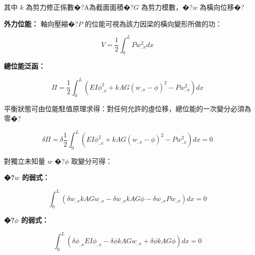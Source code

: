 \documentclass[UTF8, a4paper, 12pt]{ctexart}
\begin{document}
其中 $k$ 為剪力修正係數�?A$ 為截面面積�?G$ 為剪力模數，�?$w$ 為橫向位移�?



\textbf{外力位能：} 軸向壓縮�?$P$ 的位能可視為該力因梁的橫向變形所做的功：

\begin{equation}

    V = \frac{1}{2}\int_{0}^{L}Pw_{,x}^{2}dx

\end{equation}



\textbf{總位能泛函：}

\begin{equation}

    \Pi = \frac{1}{2}\int_{0}^{L}(EI\phi_{,x}^{2}+kAG(w_{,x}-\phi)^{2}-Pw_{,x}^{2})dx

\end{equation}






平衡狀態可由位能駐值原理求得：對任何允許的虛位移，總位能的一次變分必須為零�?

\begin{equation}

    \delta\Pi = \delta\frac{1}{2}\int_{0}^{L}(EI\phi_{,x}^{2}+kAG(w_{,x}-\phi)^{2}-Pw_{,x}^{2})dx = 0

\end{equation}



對獨立未知量 $w$ �?$\phi$ 取變分可得：



\textbf{�?$w$ 的弱式：}

\begin{equation}

    \int_{0}^{L}(\delta w_{,x}kAGw_{,x} - \delta w_{,x}kAG\phi - \delta w_{,x}Pw_{,x})dx = 0

\end{equation}



\textbf{�?$\phi$ 的弱式：}

\begin{equation}

    \int_{0}^{L}(\delta\phi_{,x}EI\phi_{,x} - \delta\phi kAGw_{,x} + \delta\phi kAG\phi)dx = 0

\end{equation}
\end{document}
